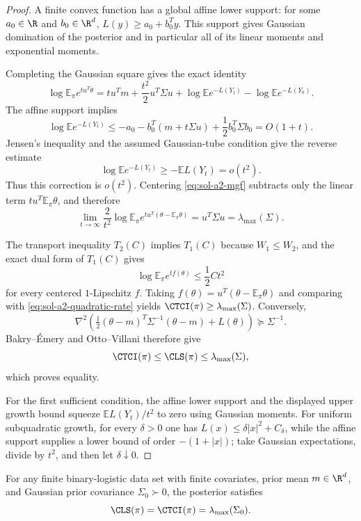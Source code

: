 \documentclass[../main.tex]{subfiles}
\begin{document}
\begin{proof}
A finite convex function has a global affine lower support: for some $a_0\in\R$ and
$b_0\in\R^d$, $L(y)\ge a_0+b_0^Ty$.  This support gives Gaussian domination of the posterior and
in particular all of its linear moments and exponential moments.

Completing the Gaussian square gives the exact identity
\begin{equation}\label{eq:sol-a2-mgf}
 \log\mathbb E_\pi e^{tu^T\theta}
 =tu^Tm+\frac{t^2}{2}u^T\Sigma u
  +\log\mathbb E e^{-L(Y_t)}-\log\mathbb E e^{-L(Y_0)}.
\end{equation}
The affine support implies
\[
 \log\mathbb E e^{-L(Y_t)}
 \le -a_0-b_0^T(m+t\Sigma u)+\frac12b_0^T\Sigma b_0=O(1+t).
\]
Jensen's inequality and the assumed Gaussian-tube condition give the reverse estimate
\[
 \log\mathbb E e^{-L(Y_t)}\ge-\mathbb E L(Y_t)=o(t^2).
\]
Thus this correction is $o(t^2)$.  Centering \eqref{eq:sol-a2-mgf} subtracts only the linear term
$tu^T\mathbb E_\pi\theta$, and therefore
\begin{equation}\label{eq:sol-a2-quadratic-rate}
 \lim_{t\to\infty}\frac2{t^2}
 \log\mathbb E_\pi e^{tu^T(\theta-\mathbb E_\pi\theta)}
 =u^T\Sigma u=\lambda_{\max}(\Sigma).
\end{equation}

The transport inequality $T_2(C)$ implies $T_1(C)$ because $W_1\le W_2$, and the exact dual
form of $T_1(C)$ gives
\[
 \log\mathbb E_\pi e^{tf(\theta)}\le\frac12Ct^2
\]
for every centered $1$-Lipschitz $f$.  Taking
$f(\theta)=u^T(\theta-\mathbb E_\pi\theta)$ and comparing with
\eqref{eq:sol-a2-quadratic-rate} yields
$\CTCI(\pi)\ge\lambda_{\max}(\Sigma)$.  Conversely,
\[
 \nabla^2\!\left(\tfrac12(\theta-m)^T\Sigma^{-1}(\theta-m)+L(\theta)\right)
 \succeq\Sigma^{-1}.
\]
Bakry--\'Emery and Otto--Villani therefore give
\[
 \CTCI(\pi)\le\CLS(\pi)\le\lambda_{\max}(\Sigma),
\]
which proves equality.

For the first sufficient condition, the affine lower support and the displayed upper growth bound
squeeze $\mathbb E L(Y_t)/t^2$ to zero using Gaussian moments.  For uniform subquadratic growth,
for every $\delta>0$ one has
$L(x)\le\delta|x|^2+C_\delta$, while the affine support supplies a lower bound of order
$-(1+|x|)$; take Gaussian expectations, divide by $t^2$, and then let $\delta\downarrow0$.
\end{proof}

\begin{corollary}
\label{cor:sol-a2-logistic}
For any finite binary-logistic data set with finite covariates, prior mean $m\in\R^d$, and
Gaussian prior covariance $\Sigma_0\succ0$, the posterior satisfies
\[
 \CLS(\pi)=\CTCI(\pi)=\lambda_{\max}(\Sigma_0).
\]
\end{corollary}
\end{document}
